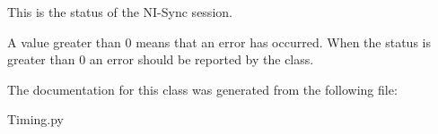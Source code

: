 This is the status of the N\-I-\/\-Sync session. 

A value greater than 0 means that an error has occurred. When the status is greater than 0 an error should be reported by the class. 

The documentation for this class was generated from the following file\-:\begin{DoxyCompactItemize}
\item 
Timing.\-py\end{DoxyCompactItemize}

